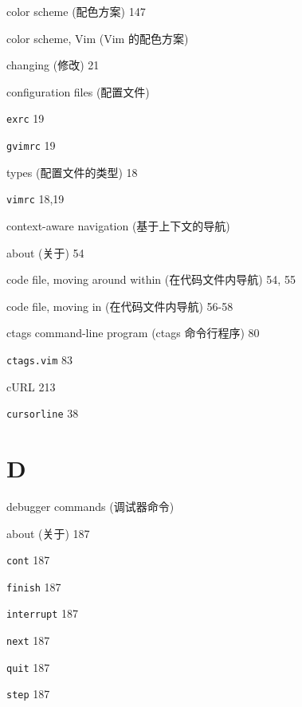 \begin{multicols}{2}
\hangindent=3pc  color scheme (配色方案) 147

\hangindent=3pc  color scheme, Vim (Vim 的配色方案) \par
\hangindent=3pc \quad changing (修改) 21 \par

\hangindent=3pc  configuration files (配置文件) \par
\hangindent=3pc \quad \texttt{exrc} 19 \par
\hangindent=3pc \quad \texttt{gvimrc} 19 \par
\hangindent=3pc \quad types (配置文件的类型) 18 \par
\hangindent=3pc \quad \texttt{vimrc} 18,19 \par

\hangindent=3pc  context-aware navigation (基于上下文的导航) \par
\hangindent=3pc \quad about (关于) 54 \par
\hangindent=3pc \quad code file, moving around within (在代码文件内导航) 54, 55 \par
\hangindent=3pc \quad code file, moving in (在代码文件内导航) 56-58 \par

\hangindent=3pc  ctags command-line program (ctags 命令行程序) 80

\hangindent=3pc  \texttt{ctags.vim} 83

\hangindent=3pc  cURL 213

\hangindent=3pc  \texttt{cursorline} 38

\hangindent=3pc  \section*{D}

\hangindent=3pc  debugger commands (调试器命令) \par
\hangindent=3pc \quad about (关于) 187 \par
\hangindent=3pc \quad \texttt{cont} 187 \par
\hangindent=3pc \quad \texttt{finish} 187 \par
\hangindent=3pc \quad \texttt{interrupt} 187 \par
\hangindent=3pc \quad \texttt{next} 187 \par
\hangindent=3pc \quad \texttt{quit} 187 \par
\hangindent=3pc \quad \texttt{step} 187 \par


\end{multicols}
